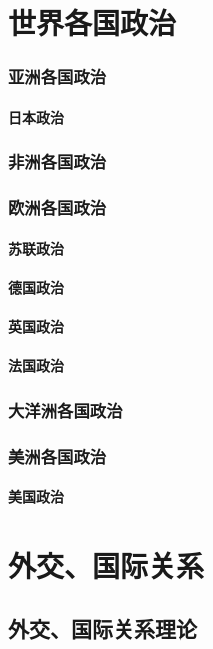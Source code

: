 \documentclass[UTF8]{../RepresentationUniverse}
\begin{document}
\chapter{世界各国政治}
\subsection{亚洲各国政治}
    \subsubsection{日本政治}
\subsection{非洲各国政治}
\subsection{欧洲各国政治}
    \subsubsection{苏联政治}
    \subsubsection{德国政治}
    \subsubsection{英国政治}
    \subsubsection{法国政治}
\subsection{大洋洲各国政治}
\subsection{美洲各国政治}
    \subsubsection{美国政治}






\chapter{外交、国际关系}
\section{外交、国际关系理论}
\end{document}
